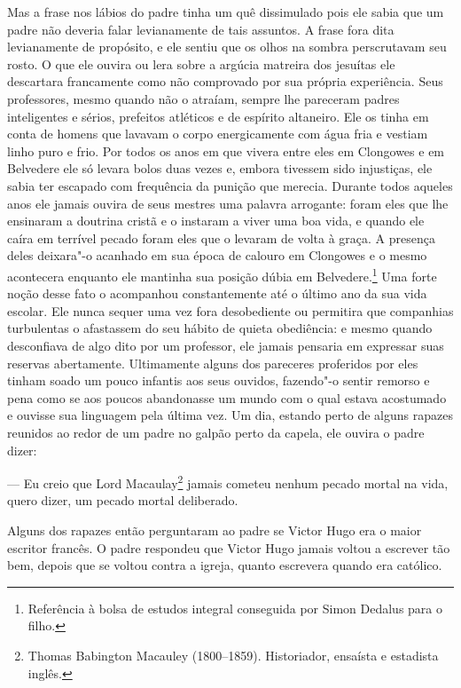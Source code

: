Mas a frase nos lábios do padre tinha um quê dissimulado pois ele sabia
que um padre não deveria falar levianamente de tais assuntos. A frase
fora dita levianamente de propósito, e ele sentiu que os olhos na
sombra perscrutavam seu rosto. O que ele ouvira ou lera sobre a argúcia
matreira dos jesuítas ele descartara francamente como não comprovado
por sua própria experiência. Seus professores, mesmo quando não o
atraíam, sempre lhe pareceram padres inteligentes e sérios, prefeitos 
atléticos e de espírito altaneiro. Ele os tinha em conta de homens que
lavavam o corpo energicamente com água fria e vestiam linho puro e
frio. Por todos os anos em que vivera entre eles em Clongowes e em
Belvedere ele só levara bolos duas vezes e, embora tivessem sido
injustiças, ele sabia ter escapado com frequência da punição que
merecia. Durante todos aqueles anos ele jamais ouvira de seus mestres
uma palavra arrogante: foram eles que lhe ensinaram a doutrina cristã e
o instaram a viver uma boa vida, e quando ele caíra em terrível pecado
foram eles que o levaram de volta à graça. A presença deles deixara"-o
acanhado em sua época de calouro em Clongowes e o mesmo acontecera
enquanto ele mantinha sua posição dúbia em Belvedere.\footnote{
Referência à bolsa de estudos integral conseguida por Simon Dedalus
para o filho.} Uma forte noção desse fato o acompanhou constantemente
até o último ano da sua vida escolar. Ele nunca sequer uma vez fora
desobediente ou permitira que companhias turbulentas o afastassem do
seu hábito de quieta obediência: e mesmo quando desconfiava de algo
dito por um professor, ele jamais pensaria em expressar suas reservas
abertamente. Ultimamente alguns dos pareceres proferidos por eles
tinham soado um pouco infantis aos seus ouvidos, fazendo"-o sentir
remorso e pena como se aos poucos abandonasse um mundo com o qual
estava acostumado e ouvisse sua linguagem pela última vez. Um dia,
estando perto de alguns rapazes reunidos ao redor de um padre no galpão
perto da capela, ele ouvira o padre dizer:

 --- Eu creio que Lord Macaulay\footnote{ Thomas Babington Macauley (1800--1859).
Historiador, ensaísta e estadista inglês.} jamais cometeu nenhum pecado mortal
na vida, quero dizer, um pecado mortal deliberado.

Alguns dos rapazes então perguntaram ao padre se Victor Hugo era o maior
escritor francês. O padre respondeu que Victor Hugo jamais voltou a
escrever tão bem, depois que se voltou contra a igreja, quanto
escrevera quando era católico.

